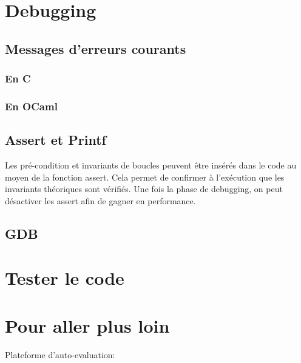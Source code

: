 \documentclass{article}
\begin{document}
\section{Debugging}

\subsection{Messages d'erreurs courants}


\subsubsection{En C}

\subsubsection{En OCaml}

\subsection{Assert et Printf}

Les pr\'e-condition et invariants de boucles peuvent \^etre ins\'er\'es dans le code au moyen de la fonction assert. Cela permet de confirmer \`a l'ex\'ecution que les invariants th\'eoriques sont v\'erifi\'es. Une fois la phase de debugging, on peut d\'esactiver les assert afin de gagner en performance.

\subsection{GDB}




\section{Tester le code}


\section{Pour aller plus loin}


Plateforme d'auto-evaluation:



\end{document}
